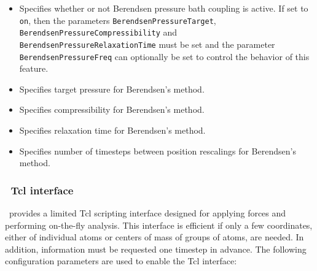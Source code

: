 \begin{itemize}

\item
{}
{Specifies whether or not Berendsen pressure bath coupling is active.  
If set to \verb!on!, then the parameters \verb!BerendsenPressureTarget!, \verb!BerendsenPressureCompressibility! and \verb!BerendsenPressureRelaxationTime! must be set 
and the parameter \verb!BerendsenPressureFreq! can
optionally be set to control the behavior of this feature.} 

\item
{}
{Specifies target pressure for Berendsen's method.}

\item
{}
{Specifies compressibility for Berendsen's method.}

\item
{}
{Specifies relaxation time for Berendsen's method.}

\item
{}
{Specifies number of timesteps between position rescalings for Berendsen's method.}

\end{itemize}


\subsubsection{\NAMD\ Tcl interface}

\NAMD\ provides a limited Tcl scripting interface designed for applying forces and performing on-the-fly analysis.
This interface is efficient if only a few coordinates, either of individual atoms or centers of mass of groups of atoms, are needed.
In addition, information must be requested one timestep in advance.
The following configuration parameters are used to enable the Tcl interface:

